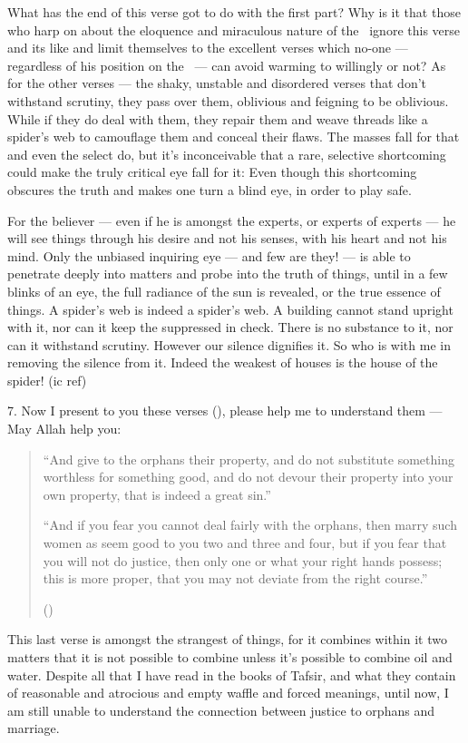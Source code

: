 \documentclass[12pt]{memoir}
\begin{document}
What has the end of this verse got to do with the first part?
Why is it that those who harp on about the eloquence
and miraculous nature of the \Quran\ ignore this verse
and its like and limit themselves to the excellent verses which no-one —
regardless of his position on the \Quran\ —
can avoid warming to willingly or not?
As for the other verses — the shaky, unstable and disordered verses
that don’t withstand scrutiny, they pass over them,
oblivious and feigning to be oblivious.
While if they do deal with them, they repair them
and weave threads like a spider’s web to camouflage them
and conceal their flaws.
The masses fall for that and even the select do,
but it’s inconceivable that a rare,
selective shortcoming could make the truly critical eye fall for it:
Even though this shortcoming obscures the truth
and makes one turn a blind eye, in order to play safe.

For the believer — even if he is amongst the experts, or experts of experts —
he will see things through his desire and not his senses,
with his heart and not his mind.
Only the unbiased inquiring eye — and few are they! —
is able to penetrate deeply into matters and probe into the truth of things,
until in a few blinks of an eye, the full radiance of the sun is revealed,
or the true essence of things.
A spider’s web is indeed a spider’s web.
A building cannot stand upright with it,
nor can it keep the suppressed in check.
There is no substance to it, nor can it withstand scrutiny.
However our silence dignifies it.
So who is with me in removing the silence from it.
Indeed the weakest of houses is the house of the spider! (\Quran{}ic ref)

7. Now I present to you these verses (),
please help me to understand them — May Allah help you:

\begin{quote}
“And give to the orphans their property, and do not substitute
something worthless for something good,
and do not devour their property into your own property,
that is indeed a great sin.”

“And if you fear you cannot deal fairly with the orphans,
then marry such women as seem good to you two and three and four,
but if you fear that you will not do justice,
then only one or what your right hands possess; this is more proper,
that you may not deviate from the right course.”

()
\end{quote}

This last verse is amongst the strangest of things,
for it combines within it two matters that it is not possible
to combine unless it’s possible to combine oil and water.
Despite all that I have read in the books of Tafsir,
and what they contain of reasonable and atrocious and empty waffle
and forced meanings, until now, I am still unable to understand
the connection between justice to orphans and marriage.
\end{document}
